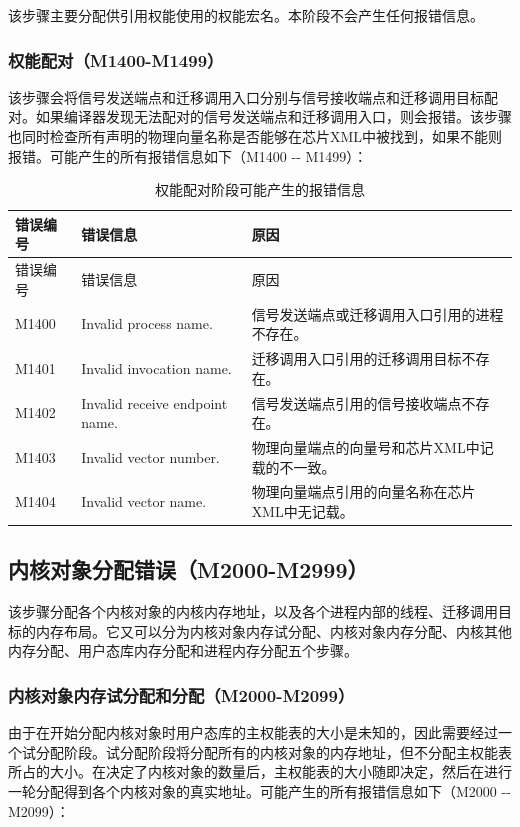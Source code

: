 该步骤主要分配供引用权能使用的权能宏名。本阶段不会产生任何报错信息。

\subsubsection{权能配对（M1400-M1499）}\label{subsubsec:5-6-5-5}

该步骤会将信号发送端点和迁移调用入口分别与信号接收端点和迁移调用目标配对。如果编译器发现无法配对的信号发送端点和迁移调用入口，则会报错。该步骤也同时检查所有声明的物理向量名称是否能够在芯片XML中被找到，如果不能则报错。可能产生的所有报错信息如下（M1400
-\/- M1499）：

\begin{xltabular}{\textwidth}{@{}>{\hsize\raggedright\arraybackslash}X>{\hsize\raggedright\arraybackslash}X>{\hsize\raggedright\arraybackslash}X@{}}
\caption{权能配对阶段可能产生的报错信息}\label{tab:5-22}\\
\toprule
错误编号 & 错误信息 & 原因\tabularnewline
\endfirsthead
\toprule
错误编号 & 错误信息 & 原因\tabularnewline
\midrule
\endhead
\bottomrule
\endlastfoot
M1400 & Invalid process name. &
信号发送端点或迁移调用入口引用的进程不存在。\tabularnewline
M1401 & Invalid invocation name. &
迁移调用入口引用的迁移调用目标不存在。\tabularnewline
M1402 & Invalid receive endpoint name. &
信号发送端点引用的信号接收端点不存在。\tabularnewline
M1403 & Invalid vector number. &
物理向量端点的向量号和芯片XML中记载的不一致。\tabularnewline
M1404 & Invalid vector name. &
物理向量端点引用的向量名称在芯片XML中无记载。\tabularnewline
\end{xltabular}

\subsection{内核对象分配错误（M2000-M2999）}\label{subsec:5-6-6}

该步骤分配各个内核对象的内核内存地址，以及各个进程内部的线程、迁移调用目标的内存布局。它又可以分为内核对象内存试分配、内核对象内存分配、内核其他内存分配、用户态库内存分配和进程内存分配五个步骤。

\newpage
{}
\subsubsection{内核对象内存试分配和分配（M2000-M2099）}\label{subsubsec:5-6-6-1}

由于在开始分配内核对象时用户态库的主权能表的大小是未知的，因此需要经过一个试分配阶段。试分配阶段将分配所有的内核对象的内存地址，但不分配主权能表所占的大小。在决定了内核对象的数量后，主权能表的大小随即决定，然后在进行一轮分配得到各个内核对象的真实地址。可能产生的所有报错信息如下（M2000
-\/- M2099）：

